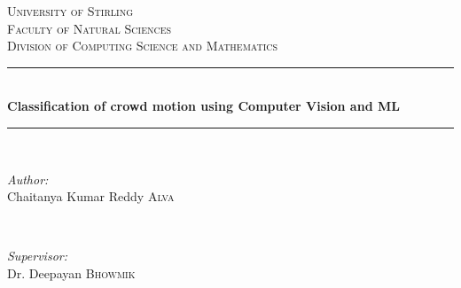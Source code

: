 %
%
%
	\begin{titlepage}
		
		\newcommand{\HRule}{\rule{\linewidth}{0.5mm}} %
		
		\center %
		
		
		\textsc{\LARGE University of Stirling}\\[1.5cm] %
		\textsc{\Large Faculty of Natural Sciences}\\[0.5cm] %
		\textsc{\large Division of Computing Science and Mathematics}\\[3.5cm] 
		\HRule \\[0.5cm]
		{ \huge \bfseries Classification of crowd motion using Computer Vision and ML}\\[1cm] %
		\HRule \\[1.2cm]
		
		
		\begin{minipage}{0.4\textwidth}
			\begin{flushleft} \large
				\emph{Author:}\\
				Chaitanya Kumar Reddy \textsc{Alva} %
			\end{flushleft}
		\end{minipage}
		~
		\begin{minipage}{0.4\textwidth}
			\begin{flushright} \large
				\emph{Supervisor:} \\
				Dr. Deepayan \textsc{Bhowmik} %
			\end{flushright}
		\end{minipage}\\[4cm]
		

\end{titlepage}
